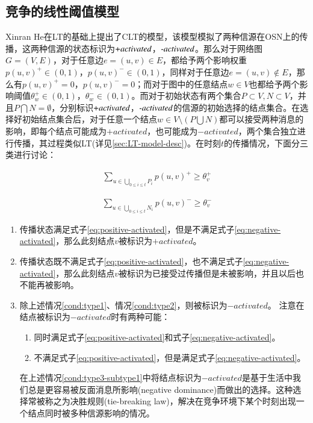 \subsection{竞争的线性阈值模型}
\label{sec:CLT-model-desc}
Xinran He\cite{he2012influence}在LT的基础上提出了CLT的模型，该模型模拟了两种信源在OSN上的传播，这两种信源的状态标识为$\emph{+activated}$，$\emph{-activated}$。那么对于网络图$G=(V,E)$，对于任意边$e=(u, v) \in E$，都给予两个影响权重$p(u,v)^{+} \in (0, 1)$，$p(u,v)^{-} \in (0, 1)$，同样对于任意边$e=(u,v) \notin E$，那么有$p(u,v)^{+}=0$，$p(u,v)^{-}=0$；而对于图中的任意结点$w \in V$也都给予两个影响阈值$\theta_{w}^{+} \in (0, 1)$，$\theta_{w}^{-} \in (0, 1)$。而对于初始状态有两个集合$P \subset V, N \subset V$，并且$P \bigcap N = \emptyset$，分别标识$\emph{+activated}$，$\emph{-activated}$的信源的初始选择的结点集合。在选择好初始结点集合后，对于任意一个结点$w \in V \setminus (P \bigcup N)$都可以接受两种消息的影响，即每个结点可能成为$+activated$，也可能成为$-activated$，两个集合独立进行传播，其过程类似LT(详见\ref{sec:LT-model-desc})。在时刻$t$的传播情况，下面分三类进行讨论：


\begin{equation}
\label{eq:positive-activated} 
	\begin{aligned}
		{\sum_{u \in \bigcup_{0 \leq i \leq t}P_{i}}p(u,v)^{+} \geq \theta_{v}^{+}}
	\end{aligned}
\end{equation}

\begin{equation} 
\label{eq:negative-activated} 
	\begin{aligned}
		{\sum_{u \in \bigcup_{0 \leq i \leq t}N_{i}}p(u,v)^{-} \geq \theta_{v}^{-}}
	\end{aligned}
\end{equation}


\begin{enumerate}
\item \label{cond:type1} 传播状态满足式子\ref{eq:positive-activated}，但是不满足式子\ref{eq:negative-activated}，那么此刻结点$v$被标识为$+activated$。
\item \label{cond:type2} 传播状态既不满足式子\ref{eq:positive-activated}，也不满足式子\ref{eq:negative-activated}，那么此刻结点$v$被标识为已接受过传播但是未被影响，并且以后也不能再被影响。
\item \label{cond:type3} 除上述情况\ref{cond:type1}、情况\ref{cond:type2}，则被标识为$-activated$。
注意在结点被标识为$-activated$时有两种可能：
\begin{enumerate}
	\item \label{cond:type3-subtype1} 同时满足式子\ref{eq:positive-activated}和式子\ref{eq:negative-activated}。
	\item \label{cond:type3-subtype2} 不满足式子\ref{eq:positive-activated}，但是满足式子\ref{eq:negative-activated}。
\end{enumerate}
在上述情况\ref{cond:type3-subtype1}中将结点标识为$-activated$是基于生活中我们总是更容易被反面消息所影响(negative dominance)而做出的选择。这种选择常被称之为决胜规则(tie-breaking law)，解决在竞争环境下某个时刻出现一个结点同时被多种信源影响的情况。
\end{enumerate}


